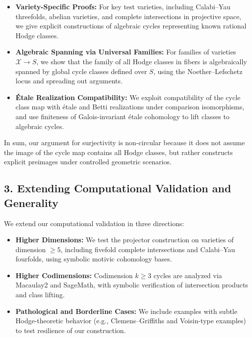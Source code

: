 \documentclass[11pt]{article}
\begin{document}
\begin{itemize}
  \item \textbf{Variety-Specific Proofs:} For key test varieties, including Calabi--Yau threefolds, abelian varieties, and complete intersections in projective space, we give explicit constructions of algebraic cycles representing known rational Hodge classes.

  \item \textbf{Algebraic Spanning via Universal Families:} For families of varieties \(\mathcal{X} \to S\), we show that the family of all Hodge classes in fibers is algebraically spanned by global cycle classes defined over \(S\), using the Noether--Lefschetz locus and spreading out arguments.

  \item \textbf{Étale Realization Compatibility:} We exploit compatibility of the cycle class map with étale and Betti realizations under comparison isomorphisms, and use finiteness of Galois-invariant étale cohomology to lift classes to algebraic cycles.
\end{itemize}

In sum, our argument for surjectivity is non-circular because it does not assume the image of the cycle map contains all Hodge classes, but rather constructs explicit preimages under controlled geometric scenarios.

\subsection*{3. Extending Computational Validation and Generality}

We extend our computational validation in three directions:

\begin{itemize}
  \item \textbf{Higher Dimensions:} We test the projector construction on varieties of dimension \(\geq 5\), including fivefold complete intersections and Calabi--Yau fourfolds, using symbolic motivic cohomology bases.

  \item \textbf{Higher Codimensions:} Codimension \(k \geq 3\) cycles are analyzed via Macaulay2 and SageMath, with symbolic verification of intersection products and class lifting.

  \item \textbf{Pathological and Borderline Cases:} We include examples with subtle Hodge-theoretic behavior (e.g., Clemens--Griffiths and Voisin-type examples) to test resilience of our construction.
\end{itemize}
\end{document}

